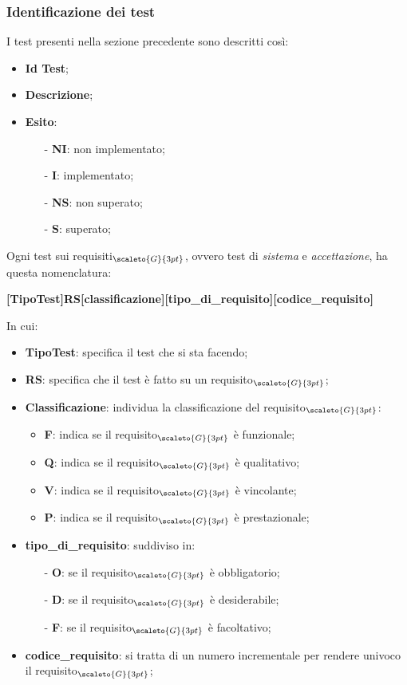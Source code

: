 \subsubsection{Identificazione dei test}\label{ProcessiDiSupportoVerificaAttivitàIdentificazioneDeiTest}
I test presenti nella sezione precedente sono descritti così:
\begin{itemize}
	\item \textbf{Id Test};
	\item \textbf{Descrizione};
	\item \textbf{Esito}:
	\begin{itemize}
		\item[-] \textbf{NI}: non implementato;
		\item[-] \textbf{I}: implementato;
		\item[-] \textbf{NS}: non superato;
		\item[-] \textbf{S}: superato;
	\end{itemize}
\end{itemize}

Ogni test sui requisiti$_{\scaleto{G}{3pt}}$, ovvero test di \textit{sistema} e \textit{accettazione}, ha questa nomenclatura:
\begin{center}
	\textbf{[TipoTest]RS[classificazione][tipo\_di\_requisito][codice\_requisito]}
\end{center}
In cui:
\begin{itemize}
	\item \textbf{TipoTest}: specifica il test che si sta facendo;
	\item \textbf{RS}: specifica che il test è fatto su un requisito$_{\scaleto{G}{3pt}}$;
	\item \textbf{Classificazione}: individua la classificazione del requisito$_{\scaleto{G}{3pt}}$:
	\begin{itemize}
		\item \textbf{F}: indica se il requisito$_{\scaleto{G}{3pt}}$ è funzionale;
		\item \textbf{Q}: indica se il requisito$_{\scaleto{G}{3pt}}$ è qualitativo;
		\item \textbf{V}: indica se il requisito$_{\scaleto{G}{3pt}}$ è vincolante;
		\item \textbf{P}: indica se il requisito$_{\scaleto{G}{3pt}}$ è prestazionale;
	\end{itemize}
	\item \textbf{tipo\_di\_requisito}: suddiviso in:
	\begin{itemize}
		\item[-] \textbf{O}: se il requisito$_{\scaleto{G}{3pt}}$ è obbligatorio;
		\item[-] \textbf{D}: se il requisito$_{\scaleto{G}{3pt}}$ è desiderabile;
		\item[-] \textbf{F}: se il requisito$_{\scaleto{G}{3pt}}$ è facoltativo;
	\end{itemize}
	\item \textbf{codice\_requisito}: si tratta di un numero incrementale per rendere univoco il requisito$_{\scaleto{G}{3pt}}$;
\end{itemize}

